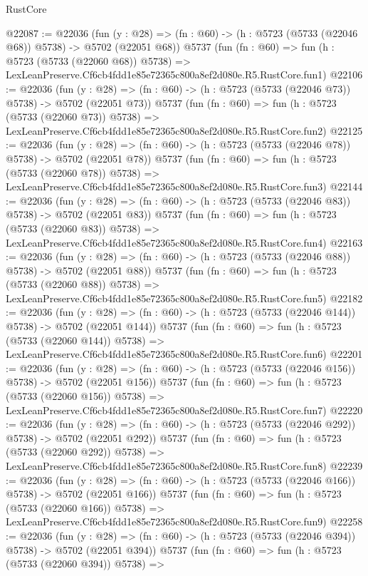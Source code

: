 \begin{lexlean}{RustCore}
\begin{coremodule}
@22087 := @22036
    (fun (y : @28) => (fn : @60) -> (h : @5723 (@5733 (@22046 @68)) @5738) -> @5702 (@22051 @68))
    @5737
    (fun (fn : @60) =>
    fun (h : @5723 (@5733 (@22060 @68)) @5738) =>
    LexLeanPreserve.Cf6cb4fdd1e85e72365c800a8ef2d080e.R5.RustCore.fun1)
@22106 := @22036
    (fun (y : @28) => (fn : @60) -> (h : @5723 (@5733 (@22046 @73)) @5738) -> @5702 (@22051 @73))
    @5737
    (fun (fn : @60) =>
    fun (h : @5723 (@5733 (@22060 @73)) @5738) =>
    LexLeanPreserve.Cf6cb4fdd1e85e72365c800a8ef2d080e.R5.RustCore.fun2)
@22125 := @22036
    (fun (y : @28) => (fn : @60) -> (h : @5723 (@5733 (@22046 @78)) @5738) -> @5702 (@22051 @78))
    @5737
    (fun (fn : @60) =>
    fun (h : @5723 (@5733 (@22060 @78)) @5738) =>
    LexLeanPreserve.Cf6cb4fdd1e85e72365c800a8ef2d080e.R5.RustCore.fun3)
@22144 := @22036
    (fun (y : @28) => (fn : @60) -> (h : @5723 (@5733 (@22046 @83)) @5738) -> @5702 (@22051 @83))
    @5737
    (fun (fn : @60) =>
    fun (h : @5723 (@5733 (@22060 @83)) @5738) =>
    LexLeanPreserve.Cf6cb4fdd1e85e72365c800a8ef2d080e.R5.RustCore.fun4)
@22163 := @22036
    (fun (y : @28) => (fn : @60) -> (h : @5723 (@5733 (@22046 @88)) @5738) -> @5702 (@22051 @88))
    @5737
    (fun (fn : @60) =>
    fun (h : @5723 (@5733 (@22060 @88)) @5738) =>
    LexLeanPreserve.Cf6cb4fdd1e85e72365c800a8ef2d080e.R5.RustCore.fun5)
@22182 := @22036
    (fun (y : @28) => (fn : @60) -> (h : @5723 (@5733 (@22046 @144)) @5738) -> @5702 (@22051 @144))
    @5737
    (fun (fn : @60) =>
    fun (h : @5723 (@5733 (@22060 @144)) @5738) =>
    LexLeanPreserve.Cf6cb4fdd1e85e72365c800a8ef2d080e.R5.RustCore.fun6)
@22201 := @22036
    (fun (y : @28) => (fn : @60) -> (h : @5723 (@5733 (@22046 @156)) @5738) -> @5702 (@22051 @156))
    @5737
    (fun (fn : @60) =>
    fun (h : @5723 (@5733 (@22060 @156)) @5738) =>
    LexLeanPreserve.Cf6cb4fdd1e85e72365c800a8ef2d080e.R5.RustCore.fun7)
@22220 := @22036
    (fun (y : @28) => (fn : @60) -> (h : @5723 (@5733 (@22046 @292)) @5738) -> @5702 (@22051 @292))
    @5737
    (fun (fn : @60) =>
    fun (h : @5723 (@5733 (@22060 @292)) @5738) =>
    LexLeanPreserve.Cf6cb4fdd1e85e72365c800a8ef2d080e.R5.RustCore.fun8)
@22239 := @22036
    (fun (y : @28) => (fn : @60) -> (h : @5723 (@5733 (@22046 @166)) @5738) -> @5702 (@22051 @166))
    @5737
    (fun (fn : @60) =>
    fun (h : @5723 (@5733 (@22060 @166)) @5738) =>
    LexLeanPreserve.Cf6cb4fdd1e85e72365c800a8ef2d080e.R5.RustCore.fun9)
@22258 := @22036
    (fun (y : @28) => (fn : @60) -> (h : @5723 (@5733 (@22046 @394)) @5738) -> @5702 (@22051 @394))
    @5737
    (fun (fn : @60) =>
    fun (h : @5723 (@5733 (@22060 @394)) @5738) =>

\end{coremodule}
\end{lexlean}
